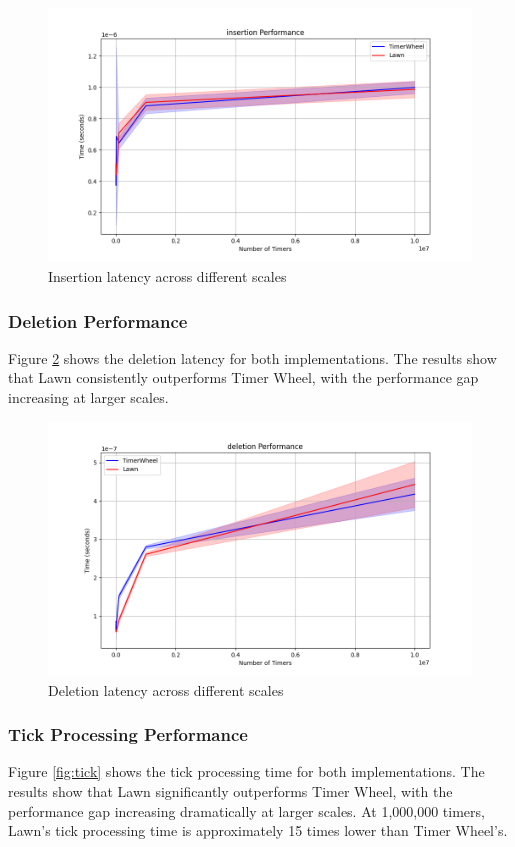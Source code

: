 \documentclass[conference]{IEEEtran}
\begin{document}
\begin{figure}[ht]
	\centering
	\includegraphics[width=0.9\linewidth]{insertion.png}
	\caption{Insertion latency across different scales}
	\label{fig:insertion}
\end{figure}

\subsubsection{Deletion Performance}
Figure \ref{fig:deletion} shows the deletion latency for both implementations. The results show that Lawn consistently outperforms Timer Wheel, with the performance gap increasing at larger scales.

\begin{figure}[ht]
	\centering
	\includegraphics[width=0.9\linewidth]{deletion.png}
	\caption{Deletion latency across different scales}
	\label{fig:deletion}
\end{figure}

\subsubsection{Tick Processing Performance}
Figure \ref{fig:tick} shows the tick processing time for both implementations. The results show that Lawn significantly outperforms Timer Wheel, with the performance gap increasing dramatically at larger scales. At 1,000,000 timers, Lawn's tick processing time is approximately 15 times lower than Timer Wheel's.
\end{document}
